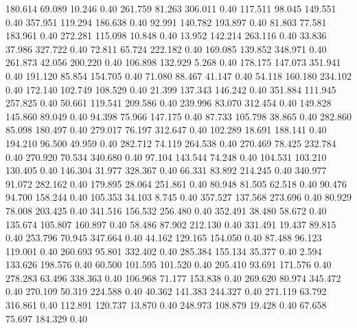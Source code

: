  180.614   69.089   10.246         0.40
 261.759   81.263  306.011         0.40
 117.511   98.045  149.551         0.40
 357.951  119.294  186.638         0.40
  92.991  140.782  193.897         0.40
  81.803   77.581  183.961         0.40
 272.281  115.098   10.848         0.40
  13.952  142.214  263.116         0.40
  33.836   37.986  327.722         0.40
  72.811   65.724  222.182         0.40
 169.085  139.852  348.971         0.40
 261.873   42.056  200.220         0.40
 106.898  132.929    5.268         0.40
 178.175  147.073  351.941         0.40
 191.120   85.854  154.705         0.40
  71.080   88.467   41.147         0.40
  54.118  160.180  234.102         0.40
 172.140  102.749  108.529         0.40
  21.399  137.343  146.242         0.40
 351.884  111.945  257.825         0.40
  50.661  119.541  209.586         0.40
 239.996   83.070  312.454         0.40
 149.828  145.860   89.049         0.40
  94.398   75.966  147.175         0.40
  87.733  105.798   38.865         0.40
 282.860   85.098  180.497         0.40
 279.017   76.197  312.647         0.40
 102.289   18.691  188.141         0.40
 194.210   96.500   49.959         0.40
 282.712   74.119  264.538         0.40
 270.469   78.425  232.784         0.40
 270.920   70.534  340.680         0.40
  97.104  143.544   74.248         0.40
 104.531  103.210  130.405         0.40
 146.304   31.977  328.367         0.40
  66.331   83.892  214.245         0.40
 340.977   91.072  282.162         0.40
 179.895   28.064  251.861         0.40
  80.948   81.505   62.518         0.40
  90.476   94.700  158.244         0.40
 105.353   34.103    8.745         0.40
 357.527  137.568  273.696         0.40
  80.929   78.008  203.425         0.40
 341.516  156.532  256.480         0.40
 352.491   38.480   58.672         0.40
 135.674  105.807  160.897         0.40
  58.486   87.902  212.130         0.40
 331.491   19.437   89.815         0.40
 253.796   70.945  347.664         0.40
  44.162  129.165  154.050         0.40
  87.488   96.123  119.001         0.40
 260.693   95.801  332.402         0.40
 285.384  155.134   35.377         0.40
   2.594  133.626  198.576         0.40
  60.500  101.595  101.520         0.40
 205.410   93.691  171.576         0.40
 278.283   63.496  338.363         0.40
 106.968   71.177  153.838         0.40
 269.620   80.974  345.472         0.40
 270.109   50.319  224.588         0.40
  40.362  141.383  244.327         0.40
 271.119   63.792  316.861         0.40
 112.891  120.737   13.870         0.40
 248.973  108.879   19.428         0.40
  67.658   75.697  184.329         0.40

